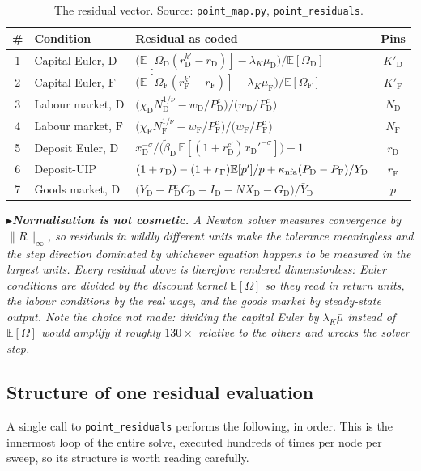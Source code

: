 \documentclass[11pt]{article}
\numberwithin{equation}{section}
\newcommand{\E}{\mathbb{E}}
\newcommand{\code}[1]{\texttt{\small #1}}
\newcommand{\D}{\mathrm{D}}
\newcommand{\F}{\mathrm{F}}
\theoremstyle{definition}
\theoremstyle{plain}
\theoremstyle{remark}
\newcommand{\trick}[1]{\par\smallskip\noindent
  \textcolor{notec}{$\blacktriangleright$}\;\emph{#1}\par\smallskip}
\begin{document}
\begin{table}[htbp]
\centering\small
\caption{The residual vector. Source: \code{point\_map.py}, \code{point\_residuals}.}
\label{tab:seven}
\begin{tabular}{@{}clp{6.4cm}c@{}}
\toprule
\# & Condition & Residual as coded & Pins \\
\midrule
1 & Capital Euler, $\D$ &
$\bigl(\E[\Omega_\D(r^{k\prime}_\D-r_\D)]-\lambda_K\mu_\D\bigr)\big/\E[\Omega_\D]$ & $K'_\D$\\
2 & Capital Euler, $\F$ &
$\bigl(\E[\Omega_\F(r^{k\prime}_\F-r_\F)]-\lambda_K\mu_\F\bigr)\big/\E[\Omega_\F]$ & $K'_\F$\\
3 & Labour market, $\D$ &
$\bigl(\chi_\D N_\D^{1/\nu}-w_\D/P^{c}_\D\bigr)\big/\bigl(w_\D/P^{c}_\D\bigr)$ & $N_\D$\\
4 & Labour market, $\F$ &
$\bigl(\chi_\F N_\F^{1/\nu}-w_\F/P^{c}_\F\bigr)\big/\bigl(w_\F/P^{c}_\F\bigr)$ & $N_\F$\\
5 & Deposit Euler, $\D$ &
$x_\D^{-\sigma}\big/\bigl(\tilde\beta_\D\,\E[(1+r^{c\prime}_\D)x_\D'^{-\sigma}]\bigr)-1$ & $r_\D$\\
6 & Deposit-UIP &
$(1+r_\D)-(1+r_\F)\E[p']/p+\kappa_{\rm nfa}(P_\D-P_\F)/\bar Y_\D$ & $r_\F$\\
7 & Goods market, $\D$ &
$\bigl(Y_\D-P^{c}_\D C_\D-I_\D-NX_\D-G_\D\bigr)\big/\bar Y_\D$ & $p$\\
\bottomrule
\end{tabular}
\end{table}

\trick{\textbf{Normalisation is not cosmetic.} A Newton solver measures convergence
by $\|R\|_\infty$, so residuals in wildly different units make the tolerance
meaningless and the step direction dominated by whichever equation happens to be
measured in the largest units. Every residual above is therefore rendered
dimensionless: Euler conditions are divided by the discount kernel $\E[\Omega]$ so
they read in \emph{return} units, the labour conditions by the real wage, and the
goods market by steady-state output. Note the choice \emph{not} made: dividing the
capital Euler by $\lambda_K\bar\mu$ instead of $\E[\Omega]$ would amplify it roughly
$130\times$ relative to the others and wrecks the solver step.}

\subsection{Structure of one residual evaluation}

A single call to \code{point\_residuals} performs the following, in order. This is
the innermost loop of the entire solve, executed hundreds of times per node per
sweep, so its structure is worth reading carefully.
\end{document}
